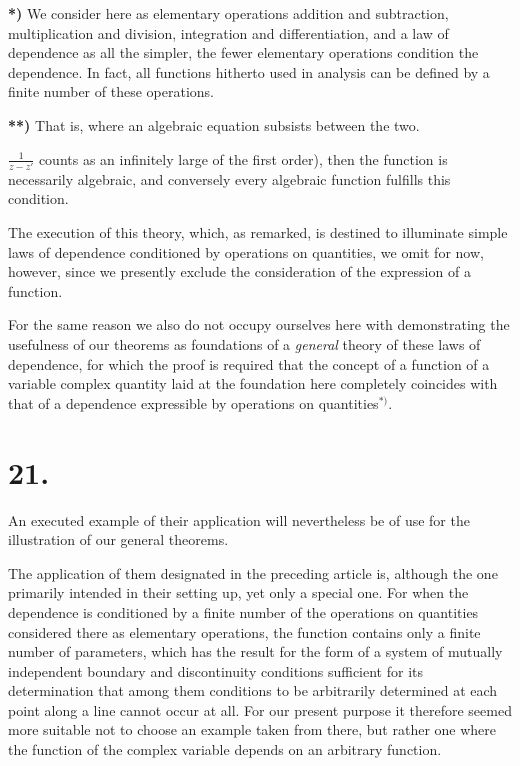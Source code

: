 \documentclass{article}
\begin{document}
\textbf{*)} We consider here as elementary operations addition and subtraction, multiplication and division, integration and differentiation, and a law of dependence as all the simpler, the fewer elementary operations condition the dependence. In fact, all functions hitherto used in analysis can be defined by a finite number of these operations.

\textbf{**)} That is, where an algebraic equation subsists between the two.

$\frac{1}{z - z'}$ counts as an infinitely large of the first order), then the function is necessarily algebraic, and conversely every algebraic function fulfills this condition.

The execution of this theory, which, as remarked, is destined to illuminate simple laws of dependence conditioned by operations on quantities, we omit for now, however, since we presently exclude the consideration of the expression of a function.

For the same reason we also do not occupy ourselves here with demonstrating the usefulness of our theorems as foundations of a \emph{general} theory of these laws of dependence, for which the proof is required that the concept of a function of a variable complex quantity laid at the foundation here completely coincides with that of a dependence expressible by operations on quantities${}^{*)}$.

\section*{21.}

An executed example of their application will nevertheless be of use for the illustration of our general theorems.

The application of them designated in the preceding article is, although the one primarily intended in their setting up, yet only a special one. For when the dependence is conditioned by a finite number of the operations on quantities considered there as elementary operations, the function contains only a finite number of parameters, which has the result for the form of a system of mutually independent boundary and discontinuity conditions sufficient for its determination that among them conditions to be arbitrarily determined at each point along a line cannot occur at all. For our present purpose it therefore seemed more suitable not to choose an example taken from there, but rather one where the function of the complex variable depends on an arbitrary function.
\end{document}
